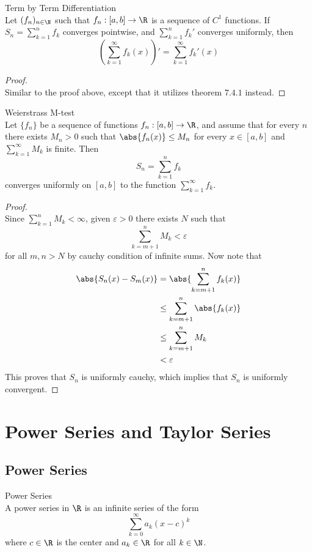 \documentclass[a4paper]{article}
\begin{document}
\begin{thm}{Term by Term Differentiation}{}\\ Let $(f_n)_{n\in\N}$ such that $f_n:[a,b]\to\R$ is a sequence of $C^1$ functions. If $S_n=\sum_{k=1}^nf_k$ converges pointwise, and $\sum_{k=1}^nf_k'$ converges uniformly, then $$\left(\sum_{k=1}^\infty f_k(x)\right)'=\sum_{k=1}^\infty f_k'(x)$$ 
\begin{proof}\\ Similar to the proof above, except that it utilizes theorem $7.4.1$ instead. 
\end{proof}
\end{thm}

\begin{thm}{Weierstrass M-test}{}\\ Let $\{f_n\}$ be a sequence of functions $f_n:[a,b]\to\R$, and assume that for every $n$ there exists $M_n>0$ such that $\abs{f_n(x)}\leq M_n$ for every $x\in[a,b]$ and $\sum_{k=1}^\infty M_k$ is finite. Then $$S_n=\sum_{k=1}^n f_k$$ converges uniformly on $[a,b]$ to the function $\sum_{k=1}^\infty f_k$. 
\begin{proof}\\
Since $\sum_{k=1}^nM_k<\infty$, given $\varepsilon>0$ there exists $N$ such that $$\sum_{k=m+1}^nM_k<\varepsilon$$ for all $m,n>N$ by cauchy condition of infinite sums. Now note that
\begin{align*}
\abs{S_n(x)-S_m(x)}&=\abs{\sum_{k=m+1}^nf_k(x)}\\
&\leq\sum_{k=m+1}^n\abs{f_k(x)}\\
&\leq\sum_{k=m+1}^nM_k\\
&<\varepsilon
\end{align*}
This proves that $S_n$ is uniformly cauchy, which implies that $S_n$ is uniformly convergent. 
\end{proof}
\end{thm}

\pagebreak
\section{Power Series and Taylor Series}
\subsection{Power Series}
\begin{defn}{Power Series}{}\\ A power series in $\R$ is an infinite series of the form $$\sum_{k=0}^\infty a_k(x-c)^k$$ where $c\in\R$ is the center and $a_k\in\R$ for all $k\in\N$. 
\end{defn}
\end{document}
